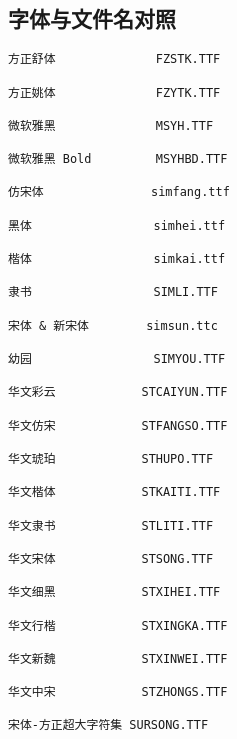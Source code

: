 \subsection{字体与文件名对照}
\begin{verbatim}
方正舒体              FZSTK.TTF

方正姚体              FZYTK.TTF

微软雅黑              MSYH.TTF

微软雅黑 Bold         MSYHBD.TTF

仿宋体               simfang.ttf

黑体                 simhei.ttf

楷体                 simkai.ttf

隶书                 SIMLI.TTF

宋体 & 新宋体        simsun.ttc

幼园                 SIMYOU.TTF

华文彩云            STCAIYUN.TTF

华文仿宋            STFANGSO.TTF

华文琥珀            STHUPO.TTF

华文楷体            STKAITI.TTF

华文隶书            STLITI.TTF

华文宋体            STSONG.TTF

华文细黑            STXIHEI.TTF

华文行楷            STXINGKA.TTF

华文新魏            STXINWEI.TTF

华文中宋            STZHONGS.TTF

宋体-方正超大字符集 SURSONG.TTF
\end{verbatim}
